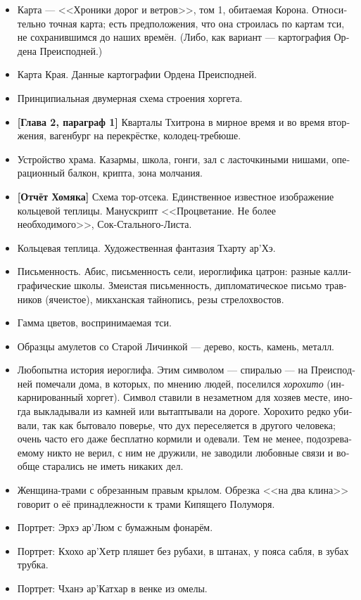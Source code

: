 \documentclass[a4paper,12pt,fleqn]{book}\usepackage{polyglossia}\setdefaultlanguage[babelshorthands=true]{russian}\setotherlanguage{english}\defaultfontfeatures{Ligatures=TeX,Mapping=tex-text}\usepackage{xcolor}\newcommand{\ml}[3]{#2}
\begin{document}
{\begin{itemize}
\item Карта --- <<Хроники дорог и ветров>>, том 1, обитаемая Корона.
Относительно точная карта;
есть предположения, что она строилась по картам тси, не сохранившимся до наших времён.
(Либо, как вариант --- картография Ордена Преисподней.)
\item Карта Края.
Данные картографии Ордена Преисподней.
\item Принципиальная двумерная схема строения хоргета.
\item \textbf{[Глава 2, параграф 1]}
Кварталы Тхитрона в мирное время и во время вторжения, вагенбург на перекрёстке, колодец-требюше.
\item Устройство храма.
Казармы, школа, гонги, зал с ласточкиными нишами, операционный балкон, крипта, зона молчания.
\item \textbf{[Отчёт Хомяка]}
Схема тор-отсека.
Единственное известное изображение кольцевой теплицы.
Манускрипт <<Процветание. Не более необходимого>>, Сок-Стального-Листа.
\item Кольцевая теплица.
Художественная фантазия Тхарту ар'Хэ.
\item Письменность.
Абис, письменность сели, иероглифика цатрон: разные каллиграфические школы.
Змеистая письменность, дипломатическое письмо травников (ячеистое), микханская тайнопись, резы стрелохвостов.
\item Гамма цветов, воспринимаемая тси.
\item Образцы амулетов со Старой Личинкой --- дерево, кость, камень, металл.
\item Любопытна история иероглифа.
Этим символом --- спиралью --- на Преисподней помечали дома, в которых, по мнению людей, поселился \emph{хорохито} (инкарнированный хоргет).
Символ ставили в незаметном для хозяев месте, иногда выкладывали из камней или вытаптывали на дороге.
Хорохито редко убивали, так как бытовало поверье, что дух переселяется в другого человека;
очень часто его даже бесплатно кормили и одевали.
Тем не менее, подозреваемому никто не верил, с ним не дружили, не заводили любовные связи и вообще старались не иметь никаких дел.
\item Женщина-трами с обрезанным правым крылом.
Обрезка <<на два клина>> говорит о её принадлежности к трами Кипящего Полуморя.
\item Портрет: Эрхэ ар'Люм с бумажным фонарём.
\item Портрет: Кхохо ар'Хетр пляшет без рубахи, в штанах, у пояса сабля, в зубах трубка.
\item Портрет: Чханэ ар'Катхар в венке из омелы.

\end{itemize}}
\end{document}

